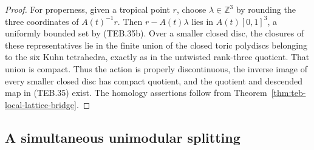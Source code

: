 \begin{proof}
For properness, given a tropical point \(r\), choose
\(\lambda\in\mathbb Z^3\) by rounding the three coordinates of
\(A(t)^{-1}r\).  Then \(r-A(t)\lambda\) lies in
\(A(t)[0,1]^3\), a uniformly bounded set by (TEB.35b).  Over a smaller closed
disc, the closures of these representatives lie in the finite union of the
closed toric polydiscs belonging to the six Kuhn tetrahedra, exactly as in
the untwisted rank-three quotient.  That union is compact.  Thus the action
is properly discontinuous, the inverse image of every smaller closed disc
has compact quotient, and the quotient and descended map in (TEB.35) exist.
The homology assertions follow from
Theorem~\ref{thm:teb-local-lattice-bridge}.
\end{proof}

\subsection{A simultaneous unimodular splitting}
\label{subsec:teb-conjugacy}

